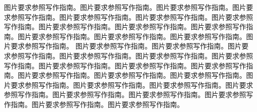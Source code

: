 \vspace{-0.2cm} %
图片要求参照写作指南。图片要求参照写作指南。图片要求参照写作指南。图片要求参照写作指南。图片要求参照写作指南。图片要求参照写作指南。图片要求参照写作指南。图片要求参照写作指南。图片要求参照写作指南。图片要求参照写作指南。图片要求参照写作指南。图片要求参照写作指南。图片要求参照写作指南。图片要求参照写作指南。
图片要求参照写作指南。图片要求参照写作指南。图片要求参照写作指南。图片要求参照写作指南。图片要求参照写作指南。图片要求参照写作指南。图片要求参照写作指南。图片要求参照写作指南。图片要求参照写作指南。图片要求参照写作指南。图片要求参照写作指南。图片要求参照写作指南。图片要求参照写作指南。图片要求参照写作指南。图片要求参照写作指南。图片要求参照写作指南。图片要求参照写作指南。图片要求参照写作指南。图片要求参照写作指南。图片要求参照写作指南。图片要求参照写作指南。


